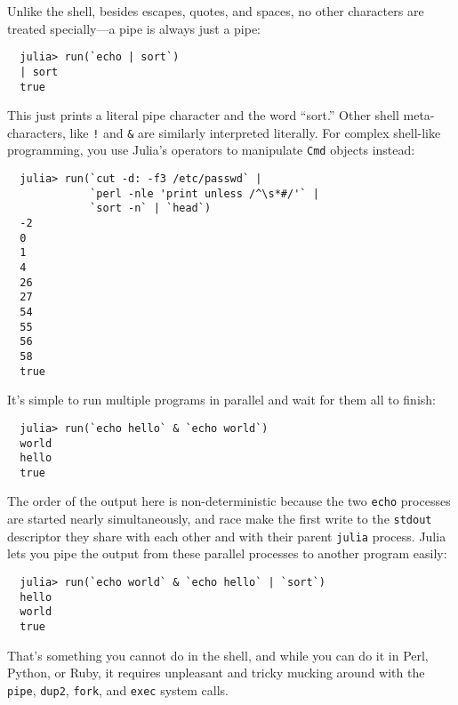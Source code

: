 \documentclass{article}
\begin{document}
Unlike the shell, besides escapes, quotes, and spaces, no other characters are treated specially---a pipe is always just a pipe:
\begin{verbatim}
  julia> run(`echo | sort`)
  | sort
  true
\end{verbatim}
This just prints a literal pipe character and the word ``sort.''
Other shell meta-characters, like \verb|!| and \verb|&| are similarly interpreted literally.
For complex shell-like programming, you use Julia's operators to manipulate \verb|Cmd| objects instead:
\begin{verbatim}
  julia> run(`cut -d: -f3 /etc/passwd` |
             `perl -nle 'print unless /^\s*#/'` |
             `sort -n` | `head`)
  -2
  0
  1
  4
  26
  27
  54
  55
  56
  58
  true
\end{verbatim}
It's simple to run multiple programs in parallel and wait for them all to finish:
\begin{verbatim}
  julia> run(`echo hello` & `echo world`)
  world
  hello
  true
\end{verbatim}
The order of the output here is non-deterministic because the two \verb|echo| processes are started nearly simultaneously, and race make the first write to the \verb|stdout| descriptor they share with each other and with their parent \verb|julia| process.
Julia lets you pipe the output from these parallel processes to another program easily:
\begin{verbatim}
  julia> run(`echo world` & `echo hello` | `sort`)
  hello
  world
  true
\end{verbatim}
That's something you cannot do in the shell, and while you can do it in Perl, Python, or Ruby, it requires unpleasant and tricky mucking around with the \verb|pipe|, \verb|dup2|, \verb|fork|, and \verb|exec| system calls.
\end{document}
